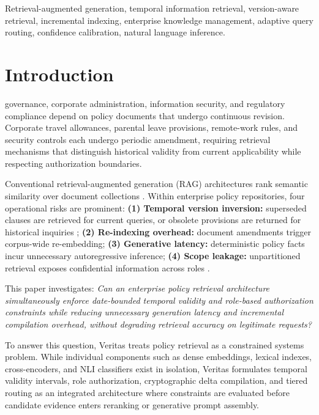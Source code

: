 \documentclass[journal]{IEEEtran}
\newcommand{\sys}{Veritas}
\begin{document}
\begin{IEEEkeywords}
Retrieval-augmented generation, temporal information retrieval, version-aware retrieval, incremental indexing, enterprise knowledge management, adaptive query routing, confidence calibration, natural language inference.
\end{IEEEkeywords}

\section{Introduction}
 governance, corporate administration, information security, and regulatory compliance depend on policy documents that undergo continuous revision. Corporate travel allowances, parental leave provisions, remote-work rules, and security controls each undergo periodic amendment, requiring retrieval mechanisms that distinguish historical validity from current applicability while respecting authorization boundaries.

Conventional retrieval-augmented generation (RAG) architectures rank semantic similarity over document collections \cite{lewis2020rag,gao2024rag_survey}. Within enterprise policy repositories, four operational risks are prominent:
\textbf{(1) Temporal version inversion:} superseded clauses are retrieved for current queries, or obsolete provisions are returned for historical inquiries \cite{campos2014temporal,huwiler2025versionrag,timelyrag2026};
\textbf{(2) Re-indexing overhead:} document amendments trigger corpus-wide re-embedding;
\textbf{(3) Generative latency:} deterministic policy facts incur unnecessary autoregressive inference;
\textbf{(4) Scope leakage:} unpartitioned retrieval exposes confidential information across roles \cite{almasoud2026sdrag,mu2026securerag}.

This paper investigates: \textit{Can an enterprise policy retrieval architecture simultaneously enforce date-bounded temporal validity and role-based authorization constraints while reducing unnecessary generation latency and incremental compilation overhead, without degrading retrieval accuracy on legitimate requests?}

To answer this question, \sys{} treats policy retrieval as a constrained systems problem. While individual components such as dense embeddings, lexical indexes, cross-encoders, and NLI classifiers exist in isolation, \sys{} formulates temporal validity intervals, role authorization, cryptographic delta compilation, and tiered routing as an integrated architecture where constraints are evaluated before candidate evidence enters reranking or generative prompt assembly.
\end{document}
